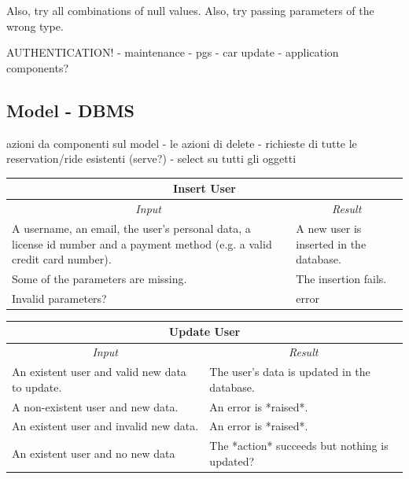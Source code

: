 \documentclass[english]{article}
\begin{document}


Also, try all combinations of null values.
Also, try passing parameters of the wrong type.

AUTHENTICATION!
- maintenance
- pgs
- car update
- application components?

\subsection{Model - DBMS}
azioni da componenti sul model
- le azioni di delete
- richieste di tutte le reservation/ride esistenti (serve?)
- select su tutti gli oggetti


\begin{center}

	\begin{tabular}{ | p{6cm} | p{6cm} | }
		\hline 
		\multicolumn{2}{|c|}{\textbf{Insert User}} \\
		\hline
		\multicolumn{1}{|c|}{\textit{Input}} & \multicolumn{1}{c|}{\textit{Result}} \\
		\hline
		A username, an email, the user's personal data, a license id number and a payment method (e.g. a valid credit card number). & A new user is inserted in the database. \\
		\hline
		Some of the parameters are missing. & The insertion fails. \\
		\hline
		Invalid parameters? & error\\
		\hline
	\end{tabular}
\end{center}
\begin{center}

	\begin{tabular}{ | p{6cm} | p{6cm} | }
		\hline 
		\multicolumn{2}{|c|}{\textbf{Update User}} \\
		\hline
		\multicolumn{1}{|c|}{\textit{Input}} & \multicolumn{1}{c|}{\textit{Result}} \\
		\hline
		An existent user and valid new data to update. &  The user's data is updated in the database. \\
		\hline
		A non-existent user and new data. & An error is *raised*. \\
		\hline
		An existent user and invalid new data. & An error is *raised*. \\
		\hline
		An existent user and no new data & The *action* succeeds but nothing is updated? \\
		\hline
	\end{tabular}
\end{center}
\end{document}
